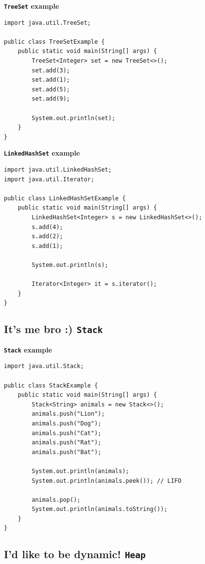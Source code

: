 \documentclass{book}
\begin{document}
\textbf{\texttt{TreeSet} example}

\begin{verbatim}
import java.util.TreeSet;

public class TreeSetExample {
    public static void main(String[] args) {
        TreeSet<Integer> set = new TreeSet<>();
        set.add(3);
        set.add(1);
        set.add(5);
        set.add(9);

        System.out.println(set);
    }
}
\end{verbatim}

\textbf{\texttt{LinkedHashSet} example}

\begin{verbatim}
import java.util.LinkedHashSet;
import java.util.Iterator;

public class LinkedHashSetExample {
    public static void main(String[] args) {
        LinkedHashSet<Integer> s = new LinkedHashSet<>();
        s.add(4);
        s.add(2);
        s.add(1);

        System.out.println(s);

        Iterator<Integer> it = s.iterator();
    }
}
\end{verbatim}

\subsection{It's me bro :) \texttt{Stack}}

\textbf{\texttt{Stack} example}

\begin{verbatim}
import java.util.Stack;

public class StackExample {
    public static void main(String[] args) {
        Stack<String> animals = new Stack<>();
        animals.push("Lion");
        animals.push("Dog");
        animals.push("Cat");
        animals.push("Rat");
        animals.push("Bat");

        System.out.println(animals);
        System.out.println(animals.peek()); // LIFO

        animals.pop();
        System.out.println(animals.toString());
    }
}
\end{verbatim}

\subsection{I'd like to be dynamic! \texttt{Heap}}
\end{document}
